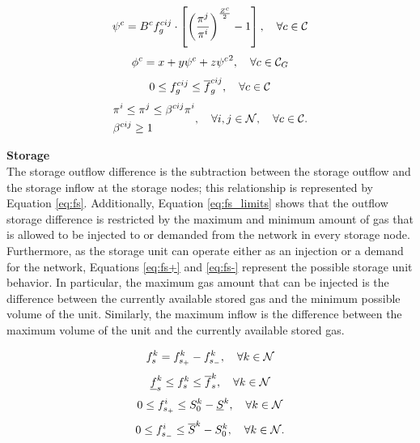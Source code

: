\begin{equation}
\psi^{c} = {B^{c}}{f}^{cij}_{g} \cdot \left[ {\left( \frac{\pi^{j}}{\pi^{i}} \right)}^{\frac{Z^{c}}{2}} - 1 \right],   \quad \forall c \in {\cal{C}}
\label{eq:hp_fc}
\end{equation}
\begin{equation} 
{\phi}^{c} = x + y \psi^{c} +  z {\psi^{c}}^{2},  \quad \forall c \in {\cal{C}}_{G}
\label{eq:g_fc}
\end{equation}
\begin{equation}
0 \le {f}^{cij}_{g} \le \overline{f}^{cij}_{g},  \quad \forall c \in {\cal{C}}
\label{eq:gfa_limits}
\end{equation}
\begin{equation}
\begin{aligned}
&\pi^{i} \le \pi^{j} \le \beta^{cij} \pi^{i}\\
&\beta^{cij} \ge 1 \\
\end{aligned}
,\quad\forall i,j \in {\cal{N}}, \quad \forall c \in {\cal{C}}.
\label{eq:presa_rel}
\end{equation}

\noindent \textbf{Storage}\\

The storage outflow difference is the subtraction between the storage outflow and the storage inflow at the storage nodes; this relationship is represented by Equation \ref{eq:fs}. Additionally, Equation \ref{eq:fs_limits} shows that the outflow storage difference is restricted by the maximum and minimum amount of gas that is allowed to be injected to or demanded from the network in every storage node. Furthermore, as the storage unit can operate either as an injection or a demand for the network, Equations \ref{eq:fs+} and \ref{eq:fs-} represent the possible storage unit behavior. In particular, the maximum gas amount that can be injected is the difference between the currently available stored gas and the minimum possible volume of the unit. Similarly, the maximum inflow is the difference between the maximum volume of the unit and the currently available stored gas.

\begin{equation}
f_{s}^{k} = f_{s_+}^{k}  - f_{s_-}^{k}, \quad \forall k \in \cal{N}
\label{eq:fs}
\end{equation}
\begin{equation}
\underline{f}^{k}_{s} \le f^{k}_{s} \le \overline{f}^{k}_{s}, \quad \forall k \in \cal{N}
\label{eq:fs_limits}
\end{equation}
\begin{equation}
0 \le f_{s_+}^{i} \le S^{k}_{0}  - \underline{S}^{k}, \quad \forall k \in \cal{N}
\label{eq:fs+}
\end{equation}
\begin{equation}
0 \le f_{s_-}^{i} \le \overline{S}^{k} - S^{k}_{0}, \quad \forall k \in \cal{N}.
\label{eq:fs-}
\end{equation}

